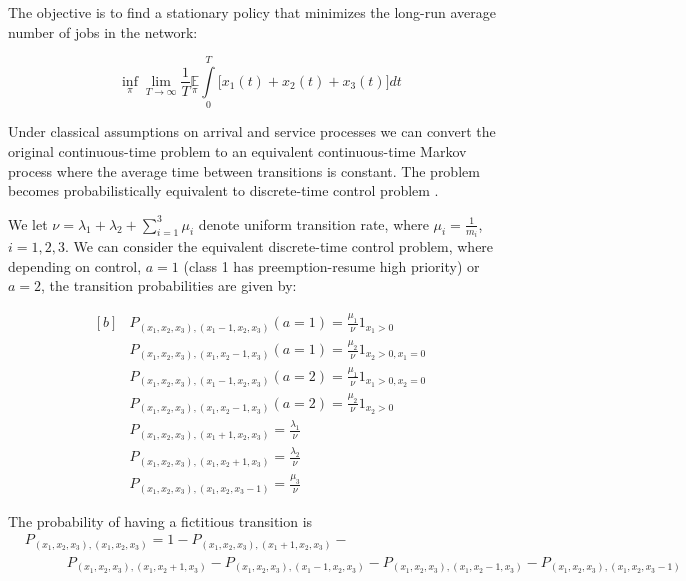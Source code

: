 \documentclass[11pt]{article}
\newcommand{\E}{\mathbb{E}}
\theoremstyle{definition}
\numberwithin{equation}{section}
\begin{document}
 The objective is to find a stationary policy that minimizes the long-run average number
of jobs in the network:

\begin{equation}\label{co}
\inf\limits_{\pi} \lim\limits_{T\rightarrow \infty} \frac{1}{T} \underset{\pi}{\E} \int\limits_0^T\Big[x_1(t)+x_2(t)+x_3(t)\Big]dt
\end{equation}

Under classical assumptions on arrival and service processes we can convert the original continuous-time problem to  an equivalent continuous-time Markov process where the average time between
transitions is constant. The problem becomes  probabilistically equivalent to   discrete-time control
problem \cite{Lippman1975}.


 We let $\nu = \lambda_1+\lambda_2 + \sum\limits_{i=1}^3 \mu_i$  denote uniform transition rate, where $\mu_i = \frac{1}{m_i}$, $i=1, 2, 3$. We can consider the equivalent discrete-time control
problem, where depending on control, $a = 1$ (class 1 has preemption-resume high priority) or $a = 2$, the transition probabilities are given by:



\begin{equation}\label{eq:pr}
        \begin{aligned}[b]
&P_{(x_1, x_2, x_3),(x_1-1, x_2, x_3) }(a=1) = \frac{\mu_1}{\nu}1_{x_1>0}\\
&P_{(x_1, x_2, x_3),(x_1, x_2-1, x_3) }(a=1) = \frac{\mu_2}{\nu}1_{x_2>0, x_1=0}\\
&P_{(x_1, x_2, x_3),(x_1-1, x_2, x_3) }(a=2) = \frac{\mu_1}{\nu}1_{x_1>0, x_2=0}\\
&P_{(x_1, x_2, x_3),(x_1, x_2-1, x_3) }(a=2) = \frac{\mu_2}{\nu}1_{x_2>0}\\
&P_{(x_1, x_2, x_3),(x_1+1, x_2, x_3) } = \frac{\lambda_1}{\nu}\\
&P_{(x_1, x_2, x_3),(x_1, x_2+1, x_3) } = \frac{\lambda_2}{\nu}\\
&P_{(x_1, x_2, x_3),(x_1, x_2, x_3-1) } = \frac{\mu_3}{\nu}
        \end{aligned}
\end{equation}

The probability of having a fictitious transition is
\begin{align*}
&P_{(x_1, x_2, x_3),(x_1, x_2, x_3) } = 1 - P_{(x_1, x_2, x_3),(x_1+1, x_2, x_3) } - \\
&\quad\quad\quad P_{(x_1, x_2, x_3),(x_1, x_2+1, x_3) } - P_{(x_1, x_2, x_3),(x_1-1, x_2, x_3) } - P_{(x_1, x_2, x_3),(x_1, x_2-1, x_3) }-P_{(x_1, x_2, x_3),(x_1, x_2, x_3-1) }
\end{align*}
\end{document}
